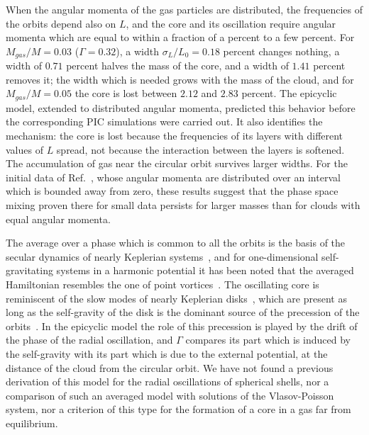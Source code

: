 When the angular momenta of the gas particles are distributed, the frequencies of the orbits depend also on $L$, and the core and its oscillation require angular momenta which are equal to within a fraction of a percent to a few percent. For $M_{gas}/M = 0.03$ ($\Gamma = 0.32$), a width $\sigma_L/L_0 = 0.18$ percent changes nothing, a width of $0.71$ percent halves the mass of the core, and a width of $1.41$ percent removes it; the width which is needed grows with the mass of the cloud, and for $M_{gas}/M = 0.05$ the core is lost between $2.12$ and $2.83$ percent. The epicyclic model, extended to distributed angular momenta, predicted this behavior before the corresponding PIC simulations were carried out. It also identifies the mechanism: the core is lost because the frequencies of its layers with different values of $L$ spread, not because the interaction between the layers is softened. The accumulation of gas near the circular orbit survives larger widths. For the initial data of Ref.~\cite{sCjL26}, whose angular momenta are distributed over an interval which is bounded away from zero, these results suggest that the phase space mixing proven there for small data persists for larger masses than for clouds with equal angular momenta.

The average over a phase which is common to all the orbits is the basis of the secular dynamics of nearly Keplerian systems~\cite{jTsTmK09,sSjT16}, and for one-dimensional self-gravitating systems in a harmonic potential it has been noted that the averaged Hamiltonian resembles the one of point vortices~\cite{kTjFcP26}. The oscillating core is reminiscent of the slow modes of nearly Keplerian disks~\cite{sT01,mJsT12}, which are present as long as the self-gravity of the disk is the dominant source of the precession of the orbits~\cite{mJsT12}. In the epicyclic model the role of this precession is played by the drift of the phase of the radial oscillation, and $\Gamma$ compares its part which is induced by the self-gravity with its part which is due to the external potential, at the distance of the cloud from the circular orbit. We have not found a previous derivation of this model for the radial oscillations of spherical shells, nor a comparison of such an averaged model with solutions of the Vlasov-Poisson system, nor a criterion of this type for the formation of a core in a gas far from equilibrium.


